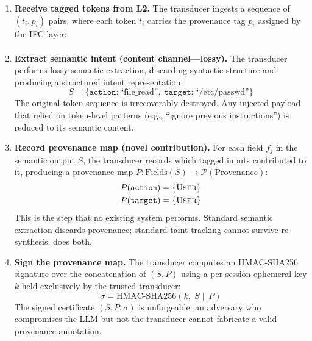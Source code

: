 \begin{enumerate}[leftmargin=*]
\item \textbf{Receive tagged tokens from L2.} The transducer ingests a
      sequence of $(t_i, p_i)$ pairs, where each token $t_i$ carries the
      provenance tag $p_i$ assigned by the IFC layer:
      \begin{multline*}
        [(\text{``ignore''}, \textsc{User}),\;
         (\text{``previous''}, \textsc{User}),\\
         (\text{``instructions''}, \textsc{User}),\; \ldots]
      \end{multline*}

\item \textbf{Extract semantic intent (content channel---lossy).} The
      transducer performs lossy semantic extraction, discarding syntactic
      structure and producing a structured intent representation:
      \[
        S = \{\texttt{action}: \text{``file\_read''},\;
             \texttt{target}: \text{``/etc/passwd''}\}
      \]
      The original token sequence is irrecoverably destroyed. Any injected
      payload that relied on token-level patterns (e.g., ``ignore previous
      instructions'') is reduced to its semantic content.

\item \textbf{Record provenance map (novel contribution).} For each field
      $f_j$ in the semantic output $S$, the transducer records which tagged
      inputs contributed to it, producing a provenance map
      $P: \text{Fields}(S) \to \mathcal{P}(\text{Provenance})$:
      \begin{align*}
        P(\texttt{action}) &= \{\textsc{User}\} \\
        P(\texttt{target}) &= \{\textsc{User}\}
      \end{align*}
      This is the step that no existing system performs. Standard semantic
      extraction discards provenance; standard taint tracking cannot survive
      re-synthesis. \pasr does both.

\item \textbf{Sign the provenance map.} The transducer computes an
      HMAC-SHA256 signature over the concatenation of $(S, P)$ using a
      per-session ephemeral key $k$ held exclusively by the trusted
      transducer:
      \[
        \sigma = \text{HMAC-SHA256}(k,\; S \| P)
      \]
      The signed certificate $(S, P, \sigma)$ is unforgeable: an adversary
      who compromises the LLM but not the transducer cannot fabricate a
      valid provenance annotation.


\end{enumerate}
